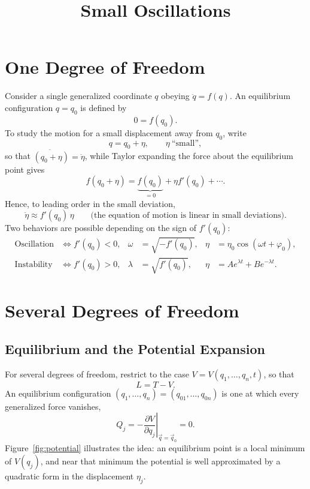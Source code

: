 \documentclass[11pt]{article}
\title{Small Oscillations}
\author{}
\date{}
\begin{document}
\maketitle
\vspace{-2.5em}

\section{One Degree of Freedom}

Consider a single generalized coordinate $q$ obeying $\ddot q = f(q)$. An equilibrium configuration $q=q_0$ is defined by
\begin{equation}
0 = f(q_0).
\end{equation}
To study the motion for a small displacement away from $q_0$, write
\begin{equation}
q = q_0+\eta, \qquad \eta \ \text{``small''},
\end{equation}
so that $\ddot{(q_0+\eta)} = \ddot\eta$, while Taylor expanding the force about the equilibrium point gives
\begin{equation}
f(q_0+\eta) = \underbrace{f(q_0)}_{=0} + \eta f'(q_0) + \cdots.
\end{equation}
Hence, to leading order in the small deviation,
\begin{equation}
\ddot\eta \approx f'(q_0)\,\eta \qquad \text{(the equation of motion is linear in small deviations).}
\end{equation}
Two behaviors are possible depending on the sign of $f'(q_0)$:
\begin{align}
\text{Oscillation} &\iff f'(q_0) < 0, & \omega &= \sqrt{-f'(q_0)}, & \eta &= \eta_0\cos(\omega t+\varphi_0),\\
\text{Instability} &\iff f'(q_0) > 0, & \lambda &= \sqrt{f'(q_0)}, & \eta &= Ae^{\lambda t}+Be^{-\lambda t}.
\end{align}

\section{Several Degrees of Freedom}

\subsection{Equilibrium and the Potential Expansion}

For several degrees of freedom, restrict to the case $V=V(q_1,\dots,q_n,t)$, so that
\begin{equation}
L = T-V.
\end{equation}
An equilibrium configuration $(q_1,\dots,q_n)=(q_{01},\dots,q_{0n})$ is one at which every generalized force vanishes,
\begin{equation}
Q_j = -\left.\frac{\partial V}{\partial q_j}\right|_{\vec q = \vec q_0} = 0 .
\end{equation}
Figure~\ref{fig:potential} illustrates the idea: an equilibrium point is a local minimum of $V(q_j)$, and near that minimum the potential is well approximated by a quadratic form in the displacement $\eta_j$.
\end{document}
